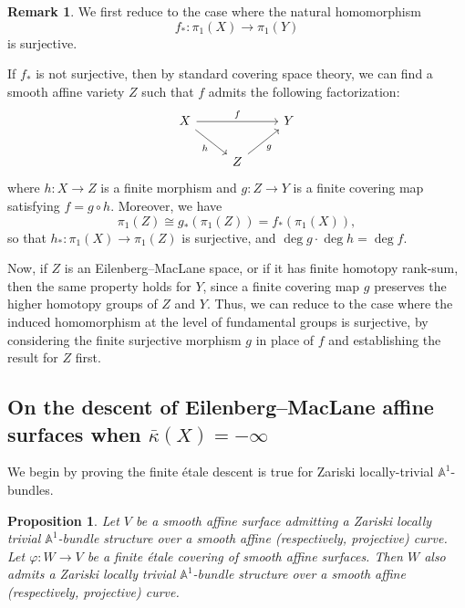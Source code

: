 \documentclass[12pt,reqno,twoside]{amsart}
\newtheorem{prop}[theorem]{Proposition}
\theoremstyle{definition}
\newtheorem{remark}[theorem]{Remark}
\numberwithin{equation}{section}
\newcommand{\A}{\mathbb{A}}
\newcommand{\Kbar}{\bar{\kappa}}
\begin{document}
\begin{remark}\label{Rem: pi_1 level map is surjective}
	We first reduce to the case where the natural homomorphism 
	\[
	f_\ast: \pi_1(X) \longrightarrow \pi_1(Y)
	\]
	is surjective. 
	
	If $f_\ast$ is not surjective, then by standard covering space theory, we can find a smooth affine variety $Z$ such that $f$ admits the following factorization:
	\[
	\begin{tikzcd}[column sep=normal, row sep=normal]
	X \arrow[rr, "f"] \arrow[dr, "h"'] & & Y\\
	& Z \arrow[ur, "g"'] & 
	\end{tikzcd}
	\]
	where $h : X \to Z$ is a finite morphism and $g : Z \to Y$ is a finite covering map satisfying $f = g \circ h$. Moreover, we have 
	\[
	\pi_1(Z) \cong g_\ast(\pi_1(Z)) = f_\ast(\pi_1(X)),
	\]
	so that $h_\ast : \pi_1(X) \to \pi_1(Z)$ is surjective, and $\deg g \cdot \deg h = \deg f$. 

    \medskip
	
	Now, if $Z$ is an Eilenberg--MacLane space, or if it has finite homotopy rank-sum, then the same property holds for $Y$, since a finite covering map $g$ preserves the higher homotopy groups of $Z$ and $Y$. Thus, we can reduce to the case where the induced homomorphism at the level of fundamental groups is surjective, by considering the finite surjective morphism $g$ in place of $f$ and establishing the result for $Z$ first.

\end{remark}


\subsection{On the descent of Eilenberg--MacLane affine surfaces when $\Kbar(X)=-\infty$}
We begin by proving the finite {\'e}tale descent is true for Zariski locally-trivial $\A^1$-bundles.

\begin{prop}\label{Prop: Etale cover of A^1-bundle preserves the bundle structure with the nature of base curve}
Let $V$ be a smooth affine surface admitting a Zariski locally trivial $\A^{1}$-bundle structure over a smooth affine (respectively, projective) curve. Let $\varphi : W \to V$ be a finite \'etale covering of smooth affine surfaces. Then $W$ also admits a Zariski locally trivial $\A^{1}$-bundle structure over a smooth affine (respectively, projective) curve.
\end{prop}
\end{document}
